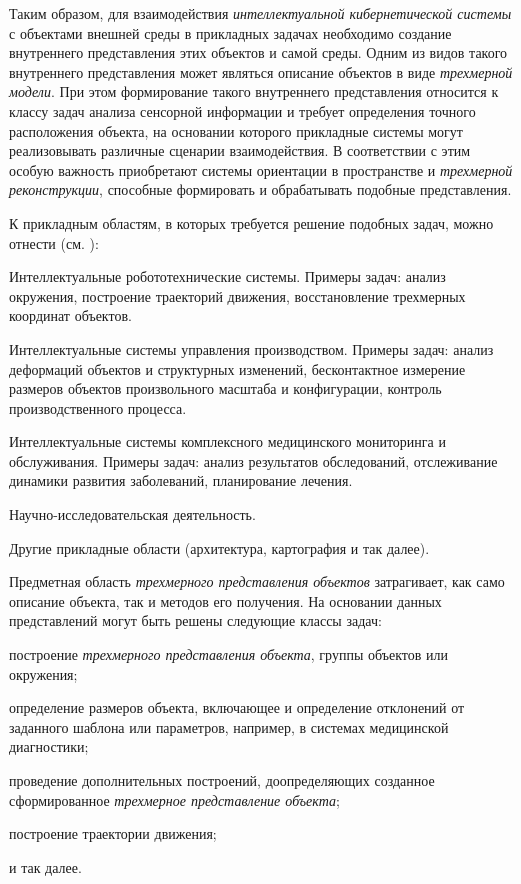 Таким образом, для взаимодействия \textit{интеллектуальной кибернетической системы} с объектами внешней среды в прикладных задачах необходимо создание внутреннего представления этих объектов и самой среды. Одним из видов такого внутреннего представления может являться описание объектов в виде \textit{трехмерной модели}. При этом формирование такого внутреннего представления относится к классу задач анализа сенсорной информации и требует определения точного расположения объекта, на основании которого прикладные системы могут реализовывать различные сценарии взаимодействия. В соответствии с этим особую важность приобретают системы ориентации в пространстве и \textit{трехмерной реконструкции}, способные формировать и обрабатывать подобные представления.

К прикладным областям, в которых требуется решение подобных задач, можно отнести (см. ):
\begin{textitemize}
    \item Интеллектуальные робототехнические системы. Примеры задач: анализ окружения, построение траекторий движения, восстановление трехмерных координат объектов.
    \item Интеллектуальные системы управления производством. Примеры задач: анализ деформаций объектов и структурных изменений, бесконтактное измерение размеров объектов произвольного масштаба и конфигурации, контроль производственного процесса.
    \item Интеллектуальные системы комплексного медицинского мониторинга и обслуживания. Примеры задач: анализ результатов обследований, отслеживание динамики развития заболеваний, планирование лечения.
    \item Научно-исследовательская деятельность.
    \item Другие прикладные области (архитектура, картография и так далее).
\end{textitemize}

Предметная область \textit{трехмерного представления объектов} затрагивает, как само описание объекта, так и методов его получения. На основании данных представлений могут быть решены следующие классы задач:

\begin{textitemize}
    \item построение \textit{трехмерного представления объекта}, группы объектов или окружения;
    \item определение размеров объекта, включающее и определение отклонений от заданного шаблона или параметров, например, в системах медицинской диагностики;
    \item проведение дополнительных построений, доопределяющих созданное сформированное \textit{трехмерное представление объекта};
    \item построение траектории движения;
    \item и так далее.
\end{textitemize}

